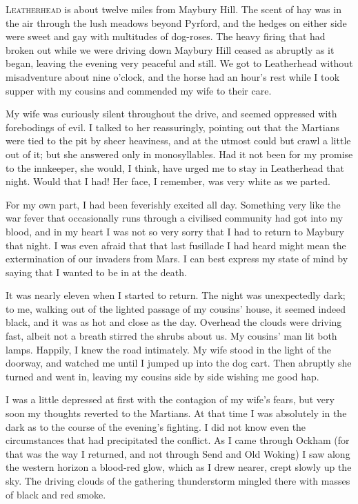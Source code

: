 

\lettrine[lines=4,findent=2pt]{L}{eatherhead} is about twelve miles from Maybury Hill. The scent of hay was in the air through the lush meadows beyond Pyrford, and the hedges on either side were sweet and gay with multitudes of dog-roses. The heavy firing that had broken out while we were driving down Maybury Hill ceased as abruptly as it began, leaving the evening very peaceful and still. We got to Leatherhead without misadventure about nine o'clock, and the horse had an hour's rest while I took supper with my cousins and commended my wife to their care.

My wife was curiously silent throughout the drive, and seemed oppressed with forebodings of evil. I talked to her reassuringly, pointing out that the Martians were tied to the pit by sheer heaviness, and at the utmost could but crawl a little out of it; but she answered only in monosyllables. Had it not been for my promise to the innkeeper, she would, I think, have urged me to stay in Leatherhead that night. Would that I had! Her face, I remember, was very white as we parted.

For my own part, I had been feverishly excited all day. Something very like the war fever that occasionally runs through a civilised community had got into my blood, and in my heart I was not so very sorry that I had to return to Maybury that night. I was even afraid that that last fusillade I had heard might mean the extermination of our invaders from Mars. I can best express my state of mind by saying that I wanted to be in at the death.

It was nearly eleven when I started to return. The night was unexpectedly dark; to me, walking out of the lighted passage of my cousins' house, it seemed indeed black, and it was as hot and close as the day. Overhead the clouds were driving fast, albeit not a breath stirred the shrubs about us. My cousins' man lit both lamps. Happily, I knew the road intimately. My wife stood in the light of the doorway, and watched me until I jumped up into the dog cart. Then abruptly she turned and went in, leaving my cousins side by side wishing me good hap.

I was a little depressed at first with the contagion of my wife's fears, but very soon my thoughts reverted to the Martians. At that time I was absolutely in the dark as to the course of the evening's fighting. I did not know even the circumstances that had precipitated the conflict. As I came through Ockham (for that was the way I returned, and not through Send and Old Woking) I saw along the western horizon a blood-red glow, which as I drew nearer, crept slowly up the sky. The driving clouds of the gathering thunderstorm mingled there with masses of black and red smoke.


